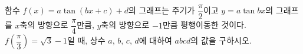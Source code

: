 함수 $f(x)=a\tan(bx+c)+d$의 그래프는 주기가 $\dfrac{\pi}{2}$이고 $y=a\tan bx$의 그래프를 $x$축의 방향으로 $\dfrac{\pi}{4}$만큼, $y$축의 방향으로 $-1$만큼 평행이동한 것이다. $f\!\left(\dfrac{\pi}{3}\right)=\sqrt{3}-1$일 때, 상수 $a$, $b$, $c$, $d$에 대하여 $abcd$의 값을 구하시오. 
